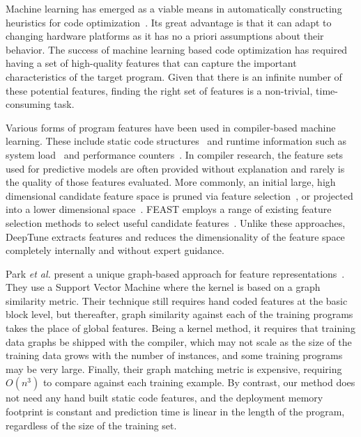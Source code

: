 

Machine learning has emerged as a viable means in automatically constructing heuristics for code optimization~\cite{Wang2010,Kulkarni2012,Muralidharan2016,Ogilvie2017,Ren,Cummins2016}. Its great advantage is that it can adapt to changing hardware platforms as it has no a priori assumptions about their behavior. The success of machine learning based code optimization has required having a set of high-quality features that can capture the important characteristics of the target program. Given that there is an infinite number of these potential features, finding the right set of features is a non-trivial, time-consuming task.

Various forms of program features have been used in compiler-based machine learning. These include static code structures~\cite{Jiang2010} and runtime information such as system load~\cite{Wen2015} and performance counters~\cite{Dubach2009}. In compiler research, the feature sets used for predictive models are often provided without explanation and rarely is the quality of those features evaluated. More commonly, an initial large, high dimensional candidate feature space is pruned via feature selection~\cite{Stephenson2005,Taylor}, or projected into a lower dimensional space~\cite{Collins2013,Dubach2007}. FEAST employs a range of existing feature selection methods to select useful candidate features~\cite{Ting2016}. Unlike these approaches, DeepTune extracts features and reduces the dimensionality of the feature space completely internally and without expert guidance.

Park \emph{et al.} present a unique graph-based approach for feature representations~\cite{Park2012}. They use a Support Vector Machine where the kernel is based on a graph similarity metric. Their technique still requires hand coded features at the basic block level, but thereafter, graph similarity against each of the training programs takes the place of global features. Being a kernel method, it requires that training data graphs be shipped with the compiler, which may not scale as the size of the training data grows with the number of instances, and some training programs may be very large. Finally, their graph matching metric is expensive, requiring $O(n^3)$ to compare against each training example. By contrast, our method does not need any hand built static code features, and the deployment memory footprint is constant and prediction time is linear in the length of the program, regardless of the size of the training set.

